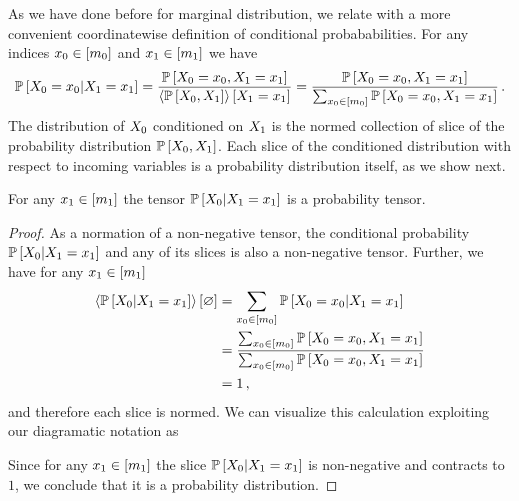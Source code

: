 As we have done before for marginal distribution, we relate  with a more convenient coordinatewise definition of conditional probababilities.
For any indices $x_{0}\in[m_{0}]$ and $x_{1}\in[m_{1}]$ we have
\begin{align*}
    \mathbb{P}\left[X_{0}=x_{0}|X_{1}=x_{1}\right]
    = \frac{\mathbb{P}\left[X_{0}=x_{0},X_{1}=x_{1}\right]}{\left\langle \mathbb{P}\left[X_{0},X_{1}\right]\right\rangle \left[ X_{1}=x_{1} \right]}
    = \frac{\mathbb{P}\left[X_{0}=x_{0},X_{1}=x_{1}\right]}{\sum_{x_{0}\in[m_{0}]} \mathbb{P}\left[X_{0}=x_{0},X_{1}=x_{1}\right]} \, .
\end{align*}
The distribution of $X_{0}$ conditioned on $X_{1}$ is the normed collection of slice of the probability distribution $\mathbb{P}\left[X_{0},X_{1}\right]$.
Each slice of the conditioned distribution with respect to incoming variables is a probability distribution itself, as we show next.

\begin{theorem}
    \label{the:conditionalContraction}
    For any $x_{1}\in[m_{1}]$ the tensor $\mathbb{P}\left[X_{0}|X_{1}=x_{1}\right]$ is a probability tensor.
\end{theorem}
\begin{proof}
    As a normation of a non-negative tensor, the conditional probability $\mathbb{P}\left[X_{0}|X_{1}=x_{1}\right]$ and any of its slices is also a non-negative tensor.
    Further, we have for any $x_{1}\in[m_{1}]$
    \begin{align*}
        \left\langle \mathbb{P}\left[X_{0}|X_{1}=x_{1}\right]\right\rangle \left[ \varnothing \right]
        & = \sum_{x_{0}\in[m_{0}]} \mathbb{P}\left[X_{0}=x_{0}|X_{1}=x_{1}\right] \\
        &= \frac{\sum_{x_{0}\in[m_{0}]}\mathbb{P}\left[X_{0}=x_{0},X_{1}=x_{1}\right]}{\sum_{x_{0}\in[m_{0}]}\mathbb{P}\left[X_{0}=x_{0},X_{1}=x_{1}\right]} \\
        &= 1 \, ,
    \end{align*}
    and therefore each slice is normed.
    We can visualize this calculation exploiting our diagramatic notation as
    \begin{center}
        
    \end{center}
    Since for any $x_{1}\in[m_{1}]$ the slice $\mathbb{P}\left[X_{0}|X_{1}=x_{1}\right]$ is non-negative and contracts to $1$, we conclude that it is a probability distribution.
\end{proof}

